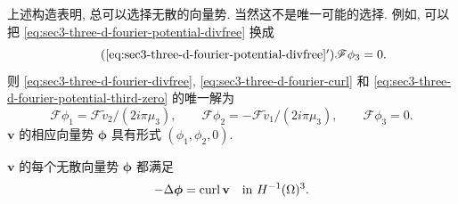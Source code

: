 \setcounter{statement}{6}
\begin{Remark}\label{rem:sec3-divfree-vector-potential-choice}
上述构造表明, 总可以选择无散的向量势. 当然这不是唯一可能的选择. 例如, 可以把
\eqref{eq:sec3-three-d-fourier-potential-divfree} 换成
\begin{equation}\tag{\ref*{eq:sec3-three-d-fourier-potential-divfree}$'$}
\label{eq:sec3-three-d-fourier-potential-third-zero}
\mathscr F\phi_3=0.
\end{equation}
则 \eqref{eq:sec3-three-d-fourier-divfree}, \eqref{eq:sec3-three-d-fourier-curl}
和 \eqref{eq:sec3-three-d-fourier-potential-third-zero} 的唯一解为
\[
\mathscr F\phi_1=\mathscr F\widetilde v_2/(2i\pi\mu_3),
\qquad
\mathscr F\phi_2=-\mathscr F\widetilde v_1/(2i\pi\mu_3),
\qquad
\mathscr F\phi_3=0.
\]
$\mathbf v$ 的相应向量势 $\boldsymbol\phi$ 具有形式 $(\phi_1,\phi_2,0)$.
\end{Remark}

\setcounter{statement}{7}
\begin{Remark}\label{rem:sec3-vector-potential-poisson}
$\mathbf v$ 的每个无散向量势 $\boldsymbol\phi$ 都满足
\[
-\Delta\boldsymbol\phi=\operatorname{curl}\mathbf v\quad\text{in }H^{-1}(\Omega)^3.
\]
\end{Remark}
